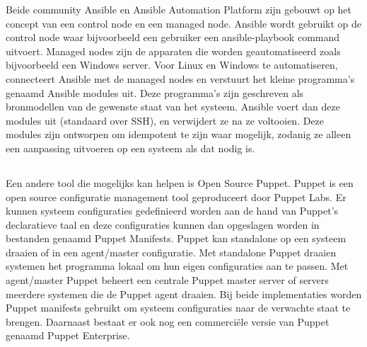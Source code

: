 Beide community Ansible en Ansible Automation Platform zijn gebouwt op het concept van een control node en een managed node. Ansible wordt gebruikt op de control node waar bijvoorbeeld een gebruiker een ansible-playbook command uitvoert. Managed nodes zijn de apparaten die worden geautomatiseerd zoals bijvoorbeeld een Windows server.
Voor Linux en Windows te automatiseren, connecteert Ansible met de managed nodes en verstuurt het kleine programma's genaamd Ansible modules uit. Deze programma's zijn geschreven als bronmodellen van de gewenste staat van het systeem. Ansible voert dan deze modules uit (standaard over SSH), en verwijdert ze na ze voltooien.
Deze modules zijn ontworpen om idempotent te zijn waar mogelijk, zodanig ze alleen een aanpassing uitvoeren op een systeem als dat nodig is. \autocite{AnisbleHow} \\

\subsection{}
\label{subsec:Puppet}

Een andere tool die mogelijks kan helpen is Open Source Puppet.
Puppet is een open source configuratie management tool geproduceert door Puppet Labs. Er kunnen systeem configuraties gedefinieerd worden aan de hand van Puppet's declaratieve taal en deze configuraties kunnen dan opgeslagen worden in bestanden genaamd Puppet Manifests.
Puppet kan standalone op een systeem draaien of in een agent/master configuratie. Met standalone Puppet draaien systemen het programma lokaal om hun eigen configuraties aan te passen. Met agent/master Puppet beheert een centrale Puppet master server of servers meerdere systemen die de Puppet agent draaien.
Bij beide implementaties worden Puppet manifests gebruikt om systeem configuraties naar de verwachte staat te brengen. Daarnaast bestaat er ook nog een commerciële versie van Puppet genaamd Puppet Enterprise. \autocite{Puppet} \\

\subsection{}
\label{subsec:Salt}

